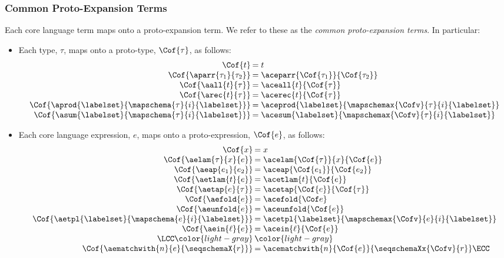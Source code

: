 \subsubsection{Common Proto-Expansion Terms} Each core language term maps onto a proto-expansion term. We refer to these as the \emph{common proto-expansion terms}. In particular:
\begin{itemize}
  \item Each type, $\tau$, maps onto a proto-type, $\Cof{\tau}$, as follows:
  \[\arraycolsep=1pt\begin{array}{rl}
  \Cof{t} & = t\\
  \Cof{\aparr{\tau_1}{\tau_2}} & = \aceparr{\Cof{\tau_1}}{\Cof{\tau_2}}\\
  \Cof{\aall{t}{\tau}} & = \aceall{t}{\Cof{\tau}}\\
  \Cof{\arec{t}{\tau}} & = \acerec{t}{\Cof{\tau}}\\
  \Cof{\aprod{\labelset}{\mapschema{\tau}{i}{\labelset}}} & = \aceprod{\labelset}{\mapschemax{\Cofv}{\tau}{i}{\labelset}}\\
  \Cof{\asum{\labelset}{\mapschema{\tau}{i}{\labelset}}} & = \acesum{\labelset}{\mapschemax{\Cofv}{\tau}{i}{\labelset}}
  \end{array}\]
  \item Each core language expression, $e$, maps onto a proto-expression, $\Cof{e}$, as follows:
  \[\arraycolsep=1pt\begin{array}{rl}
  \Cof{x} & = x\\
  \Cof{\aelam{\tau}{x}{e}} & = \acelam{\Cof{\tau}}{x}{\Cof{e}}\\
  \Cof{\aeap{e_1}{e_2}} & = \aceap{\Cof{e_1}}{\Cof{e_2}}\\
  \Cof{\aetlam{t}{e}} & = \acetlam{t}{\Cof{e}}\\
  \Cof{\aetap{e}{\tau}} & = \acetap{\Cof{e}}{\Cof{\tau}}\\
  \Cof{\aefold{e}} & = \acefold{\Cof e}\\
  \Cof{\aeunfold{e}} & = \aceunfold{\Cof{e}}\\
  \Cof{\aetpl{\labelset}{\mapschema{e}{i}{\labelset}}} & = \acetpl{\labelset}{\mapschemax{\Cofv}{e}{i}{\labelset}}\\
  \Cof{\aein{\ell}{e}} &= \acein{\ell}{\Cof{e}}\\
  \LCC \color{light-gray} & \color{light-gray} \\
  \Cof{\aematchwith{n}{e}{\seqschemaX{r}}} & = \acematchwith{n}{\Cof{e}}{\seqschemaXx{\Cofv}{r}} \ECC
  \end{array}\]
  \end{itemize}
